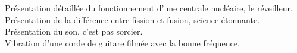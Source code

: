 Présentation détaillée du fonctionnement d'une centrale nucléaire, le réveilleur.
\\[22pt]

Présentation de la différence entre fission et fusion, science étonnante.
\\[22pt]


Présentation du son, c'est pas sorcier.
\\[22pt]

Vibration d'une corde de guitare filmée avec la bonne fréquence.
\\[22pt]

